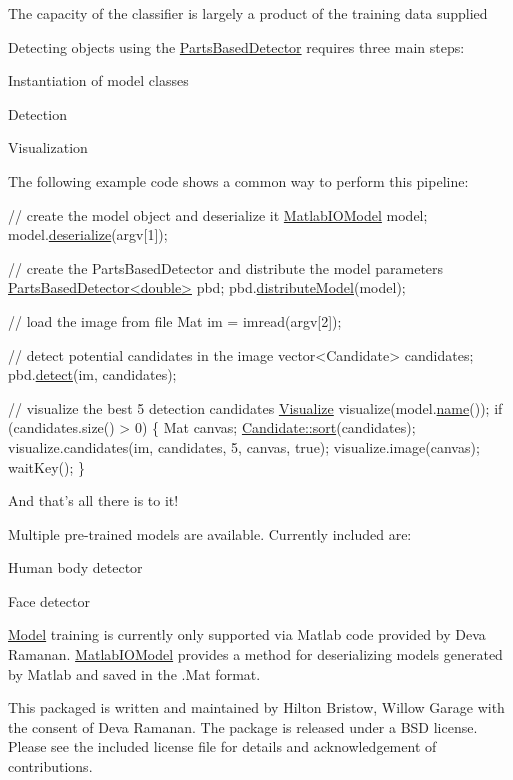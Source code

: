 The capacity of the classifier is largely a product of the training data supplied

Detecting objects using the \hyperlink{classPartsBasedDetector}{Parts\-Based\-Detector} requires three main steps\-:
\begin{DoxyItemize}
\item Instantiation of model classes
\item Detection
\item Visualization
\end{DoxyItemize}

The following example code shows a common way to perform this pipeline\-: 
\begin{DoxyCode}
\textcolor{comment}{// create the model object and deserialize it}
\hyperlink{classMatlabIOModel}{MatlabIOModel} model;
model.\hyperlink{classMatlabIOModel_a223538821bf7944a26433f7f99017f8b}{deserialize}(argv[1]);

\textcolor{comment}{// create the PartsBasedDetector and distribute the model parameters}
\hyperlink{classPartsBasedDetector}{PartsBasedDetector<double>} pbd;
pbd.\hyperlink{classPartsBasedDetector_a351a499cb2d7ab23d388a34c1c8f38a0}{distributeModel}(model);

\textcolor{comment}{// load the image from file}
Mat im = imread(argv[2]);

\textcolor{comment}{// detect potential candidates in the image}
vector<Candidate> candidates;
pbd.\hyperlink{classPartsBasedDetector_a70c77effade6c39b06ddc0102973a1f8}{detect}(im, candidates);

\textcolor{comment}{// visualize the best 5 detection candidates}
\hyperlink{classVisualize}{Visualize} visualize(model.\hyperlink{classModel_aeae6527ff13db7724c53c942029d882d}{name}());
\textcolor{keywordflow}{if} (candidates.size() > 0) \{
 Mat canvas;
  \hyperlink{classCandidate_a7e0776d9b8b7496d49f46298e93d0271}{Candidate::sort}(candidates);
  visualize.candidates(im, candidates, 5, canvas, \textcolor{keyword}{true});
  visualize.image(canvas);
  waitKey();
\}
\end{DoxyCode}


And that's all there is to it!

Multiple pre-\/trained models are available. Currently included are\-:
\begin{DoxyItemize}
\item Human body detector
\item Face detector
\end{DoxyItemize}

\hyperlink{classModel}{Model} training is currently only supported via Matlab code provided by Deva Ramanan. \hyperlink{classMatlabIOModel}{Matlab\-I\-O\-Model} provides a method for deserializing models generated by Matlab and saved in the .Mat format. 



This packaged is written and maintained by Hilton Bristow, Willow Garage with the consent of Deva Ramanan. The package is released under a B\-S\-D license. Please see the included license file for details and acknowledgement of contributions. 